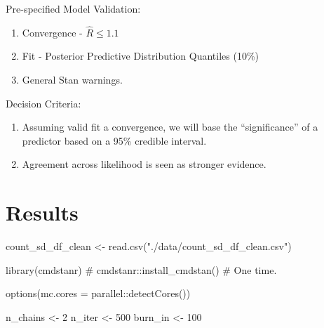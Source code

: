 \documentclass[
  letterpaper,
]{article}
\newenvironment{Shaded}{\begin{snugshade}}{\end{snugshade}}
\newcommand{\AttributeTok}[1]{\textcolor[rgb]{0.40,0.45,0.13}{#1}}
\newcommand{\CommentTok}[1]{\textcolor[rgb]{0.37,0.37,0.37}{#1}}
\newcommand{\DecValTok}[1]{\textcolor[rgb]{0.68,0.00,0.00}{#1}}
\newcommand{\FunctionTok}[1]{\textcolor[rgb]{0.28,0.35,0.67}{#1}}
\newcommand{\NormalTok}[1]{\textcolor[rgb]{0.00,0.23,0.31}{#1}}
\newcommand{\OtherTok}[1]{\textcolor[rgb]{0.00,0.23,0.31}{#1}}
\newcommand{\SpecialCharTok}[1]{\textcolor[rgb]{0.37,0.37,0.37}{#1}}
\newcommand{\StringTok}[1]{\textcolor[rgb]{0.13,0.47,0.30}{#1}}
\begin{document}
Pre-specified Model Validation:

\begin{enumerate}
\def\labelenumi{\arabic{enumi}.}
\item
  Convergence - \(\hat R \leq 1.1\)
\item
  Fit - Posterior Predictive Distribution Quantiles (10\%)
\item
  General Stan warnings.
\end{enumerate}

Decision Criteria:

\begin{enumerate}
\def\labelenumi{\arabic{enumi}.}
\item
  Assuming valid fit a convergence, we will base the ``significance'' of
  a predictor based on a 95\% credible interval.
\item
  Agreement across likelihood is seen as stronger evidence.
\end{enumerate}

\section{Results}\label{results}

\begin{Shaded}
\begin{Highlighting}[]
\NormalTok{count\_sd\_df\_clean }\OtherTok{\textless{}{-}} \FunctionTok{read.csv}\NormalTok{(}\StringTok{"./data/count\_sd\_df\_clean.csv"}\NormalTok{) }
\end{Highlighting}
\end{Shaded}

\begin{Shaded}
\begin{Highlighting}[]
\FunctionTok{library}\NormalTok{(cmdstanr)}
\CommentTok{\# cmdstanr::install\_cmdstan() \# One time. }

\FunctionTok{options}\NormalTok{(}\AttributeTok{mc.cores =}\NormalTok{ parallel}\SpecialCharTok{::}\FunctionTok{detectCores}\NormalTok{())}

\NormalTok{n\_chains }\OtherTok{\textless{}{-}} \DecValTok{2}
\NormalTok{n\_iter }\OtherTok{\textless{}{-}} \DecValTok{500}
\NormalTok{burn\_in }\OtherTok{\textless{}{-}} \DecValTok{100}
\end{Highlighting}
\end{Shaded}
\end{document}
